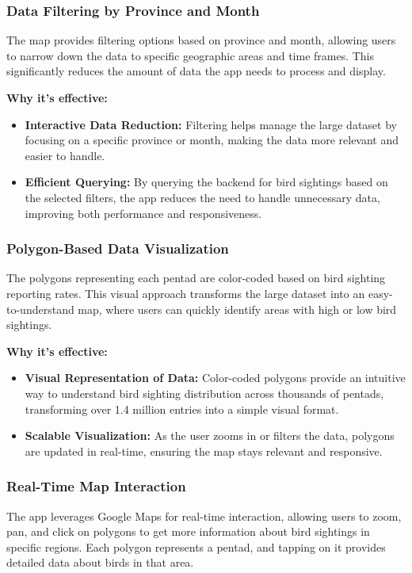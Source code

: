 \documentclass[a4paper]{article}
\begin{document}
\subsubsection{Data Filtering by Province and Month}
The map provides filtering options based on province and month, allowing users to narrow down the data to specific geographic areas and time frames. This significantly reduces the amount of data the app needs to process and display.

\textbf{Why it's effective:}
\begin{itemize}
    \item \textbf{Interactive Data Reduction:} Filtering helps manage the large dataset by focusing on a specific province or month, making the data more relevant and easier to handle.
    \item \textbf{Efficient Querying:} By querying the backend for bird sightings based on the selected filters, the app reduces the need to handle unnecessary data, improving both performance and responsiveness.
\end{itemize}

\subsubsection{Polygon-Based Data Visualization}
The polygons representing each pentad are color-coded based on bird sighting reporting rates. This visual approach transforms the large dataset into an easy-to-understand map, where users can quickly identify areas with high or low bird sightings.

\textbf{Why it's effective:}
\begin{itemize}
    \item \textbf{Visual Representation of Data:} Color-coded polygons provide an intuitive way to understand bird sighting distribution across thousands of pentads, transforming over 1.4 million entries into a simple visual format.
    \item \textbf{Scalable Visualization:} As the user zooms in or filters the data, polygons are updated in real-time, ensuring the map stays relevant and responsive.
\end{itemize}

\subsubsection{Real-Time Map Interaction}
The app leverages Google Maps for real-time interaction, allowing users to zoom, pan, and click on polygons to get more information about bird sightings in specific regions. Each polygon represents a pentad, and tapping on it provides detailed data about birds in that area.
\end{document}
